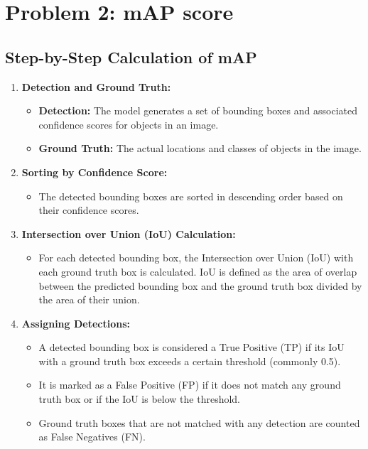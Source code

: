 \documentclass[conference]{IEEEtran}
\begin{document}
\section{Problem 2: mAP score}
\subsection*{Step-by-Step Calculation of mAP}

\begin{enumerate}
  \item \textbf{Detection and Ground Truth:}
        \begin{itemize}
          \item \textbf{Detection:} The model generates a set of bounding boxes and associated confidence scores for objects in an image.
          \item \textbf{Ground Truth:} The actual locations and classes of objects in the image.
        \end{itemize}

  \item \textbf{Sorting by Confidence Score:}
        \begin{itemize}
          \item The detected bounding boxes are sorted in descending order based on their confidence scores.
        \end{itemize}

  \item \textbf{Intersection over Union (IoU) Calculation:}
        \begin{itemize}
          \item For each detected bounding box, the Intersection over Union (IoU) with each ground truth box is calculated. IoU is defined as the area of overlap between the predicted bounding box and the ground truth box divided by the area of their union.
        \end{itemize}

  \item \textbf{Assigning Detections:}
        \begin{itemize}
          \item A detected bounding box is considered a True Positive (TP) if its IoU with a ground truth box exceeds a certain threshold (commonly 0.5).
          \item It is marked as a False Positive (FP) if it does not match any ground truth box or if the IoU is below the threshold.
          \item Ground truth boxes that are not matched with any detection are counted as False Negatives (FN).
        \end{itemize}


\end{enumerate}
\end{document}
